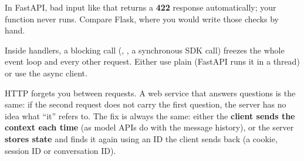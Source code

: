 In FastAPI, bad input like that returns a \textbf{422} response automatically; your function never
runs. Compare Flask, where you would write those checks by hand.

\begin{trap}
Inside  handlers, a blocking call (, , a
synchronous SDK call) freezes the whole event loop and every other request. Either use plain
 (FastAPI runs it in a thread) or use the async client.
\end{trap}

\begin{boss}
HTTP forgets you between requests. A web service that answers questions is the same: if the second
request does not carry the first question, the server has no idea what ``it'' refers to. The fix is
always the same: either the \textbf{client sends the context each time} (as model APIs do with the
message history), or the server \textbf{stores state} and finds it again using an ID the client
sends back (a cookie, session ID or conversation ID).

\begin{center}
\end{center}
\end{boss}

